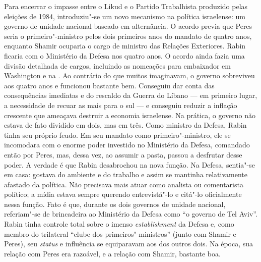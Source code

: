 Para encerrar o impasse entre o Likud e o Partido Trabalhista produzido
pelas eleições de 1984, introduziu"-se um novo mecanismo na política
israelense: um governo de unidade nacional baseado em alternância. O
acordo previa que Peres seria o primeiro"-ministro pelos dois primeiros anos
do mandato de quatro anos, enquanto Shamir ocuparia o cargo de ministro
das Relações Exteriores. Rabin ficaria com o Ministério da Defesa nos
quatro anos. O acordo ainda fazia uma divisão detalhada de cargos,
incluindo as nomeações para embaixador em Washington e na . Ao
contrário do que muitos imaginavam, o governo sobreviveu aos quatro anos
e funcionou bastante bem. Conseguiu dar conta das consequências
imediatas e do rescaldo da Guerra do Líbano --- em primeiro lugar, a
necessidade de recuar as  mais para o sul --- e conseguiu reduzir a
inflação crescente que ameaçava destruir a economia israelense. Na
prática, o governo não estava de fato dividido em dois, mas em três.
Como ministro da Defesa, Rabin tinha seu próprio feudo. Em seu mandato
como primeiro"-ministro, ele se incomodara com o enorme poder investido
no Ministério da Defesa, comandado então por Peres, mas, dessa vez,
ao assumir a pasta, passou a desfrutar desse poder.
A verdade é que Rabin desabrochou na nova função. Na Defesa, sentia"-se
em casa: gostava do ambiente e do trabalho e assim se mantinha
relativamente afastado da política. Não precisava mais atuar como
analista ou comentarista político; a mídia estava sempre querendo
entrevistá"-lo e citá"-lo oficialmente nessa função. Fato é que, durante os
dois governos de unidade nacional, referiam"-se de brincadeira ao
Ministério da Defesa como ``o governo de Tel Aviv''. Rabin tinha
controle total sobre o imenso \emph{establishment} da Defesa e, como
membro do trilateral ``clube dos primeiros"-ministros'' (junto com Shamir
e Peres), seu \emph{status} e influência se equiparavam aos dos outros dois. Na
época, sua relação com Peres era razoável, e a relação com Shamir,
bastante boa.

